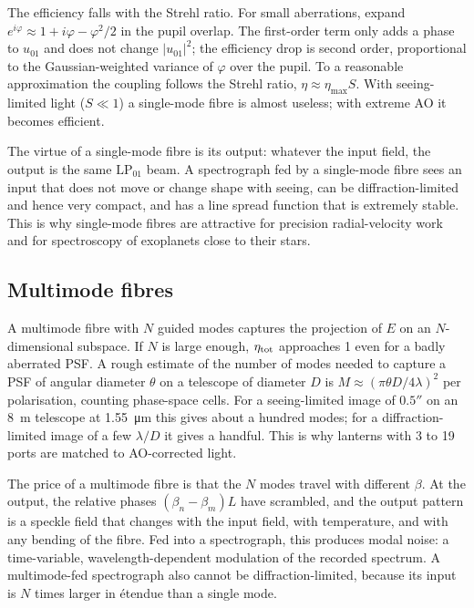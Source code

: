 \documentclass[11pt,a4paper]{article}
\begin{document}
The efficiency falls with the Strehl ratio. For small aberrations, expand $e^{i\varphi} \approx 1 + i\varphi - \varphi^2/2$ in the pupil overlap. The first-order term only adds a phase to $u_{01}$ and does not change $|u_{01}|^2$; the efficiency drop is second order, proportional to the Gaussian-weighted variance of $\varphi$ over the pupil. To a reasonable approximation the coupling follows the Strehl ratio, $\eta \approx \eta_{\max} S$. With seeing-limited light ($S \ll 1$) a single-mode fibre is almost useless; with extreme AO it becomes efficient.

The virtue of a single-mode fibre is its output: whatever the input field, the output is the same $\mathrm{LP}_{01}$ beam. A spectrograph fed by a single-mode fibre sees an input that does not move or change shape with seeing, can be diffraction-limited and hence very compact, and has a line spread function that is extremely stable. This is why single-mode fibres are attractive for precision radial-velocity work and for spectroscopy of exoplanets close to their stars.

\subsection{Multimode fibres}
A multimode fibre with $N$ guided modes captures the projection of $E$ on an $N$-dimensional subspace. If $N$ is large enough, $\eta_{\rm tot}$ approaches 1 even for a badly aberrated PSF. A rough estimate of the number of modes needed to capture a PSF of angular diameter $\theta$ on a telescope of diameter $D$ is $M \approx (\pi\theta D/4\lambda)^2$ per polarisation, counting phase-space cells. For a seeing-limited image of $0.5''$ on an \SI{8}{\meter} telescope at \SI{1.55}{\micro\meter} this gives about a hundred modes; for a diffraction-limited image of a few $\lambda/D$ it gives a handful. This is why lanterns with 3 to 19 ports are matched to AO-corrected light.

The price of a multimode fibre is that the $N$ modes travel with different $\beta$. At the output, the relative phases $(\beta_n - \beta_m)L$ have scrambled, and the output pattern is a speckle field that changes with the input field, with temperature, and with any bending of the fibre. Fed into a spectrograph, this produces modal noise: a time-variable, wavelength-dependent modulation of the recorded spectrum. A multimode-fed spectrograph also cannot be diffraction-limited, because its input is $N$ times larger in \'etendue than a single mode.
\end{document}

